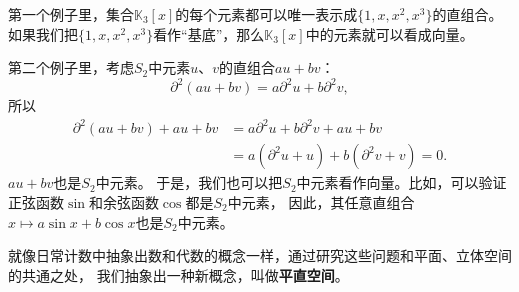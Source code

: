 \documentclass[12pt,UTF8,fontset=none]{ctexbook}
\begin{document}
第一个例子里，集合$\mathbb{K}_3[x]$的每个元素都可以唯一表示成$\{1, x, x^2, x^3\}$的直组合。
如果我们把$\{1, x, x^2, x^3\}$看作“基底”，那么$\mathbb{K}_3[x]$中的元素就可以看成向量。

第二个例子里，考虑$S_2$中元素$u$、$v$的直组合$au + bv$：
$$ \partial^2 (au + bv) = a \partial^2 u + b \partial^2 v,$$
所以
\begin{align*}
    \partial^2 (au + bv) + au + bv &= a \partial^2 u + b \partial^2 v + au + bv  \\
    &= a(\partial^2 u + u) + b(\partial^2 v + v) = 0.  
\end{align*}
$au + bv$也是$S_2$中元素。
于是，我们也可以把$S_2$中元素看作向量。比如，可以验证正弦函数$\sin$和余弦函数$\cos$都是$S_2$中元素，
因此，其任意直组合$x\mapsto a\sin{x} + b\cos{x}$也是$S_2$中元素。

就像日常计数中抽象出数和代数的概念一样，通过研究这些问题和平面、立体空间的共通之处，
我们抽象出一种新概念，叫做\textbf{平直空间}。
\end{document}
